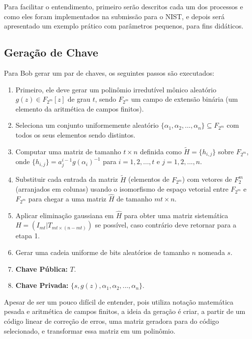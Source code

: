 Para facilitar o entendimento, primeiro serão descritos cada um dos processos e como eles foram implementados na submissão para o NIST, e depois será apresentado um exemplo prático com parâmetros pequenos, para fins didáticos.

\subsection{Geração de Chave}

Para Bob gerar um par de chaves, os seguintes passos são executados:

\begin{enumerate}
    \item Primeiro, ele deve gerar um polinômio irredutível mônico aleatório $g(z) \in {F}_{2^m}[z]$ de grau $t$, sendo ${F}_{2^m}$ um campo de extensão binária (um elemento da aritmética de campos finitos).
    \item Seleciona um conjunto uniformemente aleatório $\{\alpha_1, \alpha_2, ..., \alpha_n\} \subseteq {F}_{2^m}$ com todos os seus elementos sendo distintos.
    \item Computar uma matriz de tamanho $t \times n$ definida como $\tilde{H} = \{h_{i, j}\}$ sobre ${F}_{2^m}$, onde $ \{h_{i, j}\} = a_{j}^{i-1}g(\alpha_i)^{-1}$ para $i = 1, 2, ..., t$ e $j = 1, 2, ..., n$.
    \item Substituir cada entrada da matriz $\tilde{H}$ (elementos de ${F}_{2^m}$) com vetores de ${F}_{2}^m$ (arranjados em colunas) usando o isomorfismo de espaço vetorial entre ${F}_{2^m}$ e ${F}_{2^m}$ para chegar a uma matriz $\hat{H}$ de tamanho $mt \times n$.
    \item Aplicar eliminação gaussiana em  $\hat{H}$ para obter uma matriz sistemática $H = (I_{mt} | T_{mt \times (n-mt)})$ se possível, caso contrário deve retornar para a etapa 1.
    \item Gerar uma cadeia uniforme de bits aleatórios de tamanho $n$ nomeada $s$.
    \item \textbf{Chave Pública:} $T$.
    \item \textbf{Chave Privada:} $\{s, g(z), \alpha_1, \alpha_2, ..., \alpha_n\}$.
    
\end{enumerate}

Apesar de ser um pouco difícil de entender, pois utiliza notação matemática pesada e aritmética de campos finitos, a ideia da geração é criar, a partir de um código linear de correção de erros, uma matriz geradora para do código selecionado, e transformar essa matriz em um polinômio.

